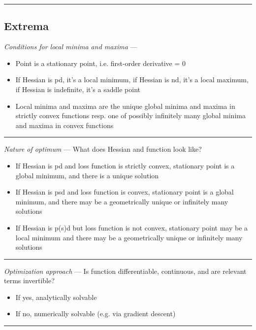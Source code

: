 {\color{black}\hrule height 0.001mm}

\subsection*{Extrema}
\emph{Conditions for local minima and maxima} --- 
\begin{itemize}
    \item Point is a stationary point, i.e. first-order derivative = 0
    \item If Hessian is pd, it's a local minimum, if Hessian is nd, it's a local maximum, if Hessian is indefinite, it's a saddle point
    \item Local minima and maxima are the unique global minima and maxima in strictly convex functions resp. one of possibly infinitely many global minima and maxima in convex functions
\end{itemize}

{\color{lightgray}\hrule height 0.001mm}

\emph{Nature of optimum} --- 
What does Hessian and function look like?
\begin{itemize}
    \item If Hessian is pd and loss function is strictly convex, stationary point is a global minimum, and there is a unique solution
    \item If Hessian is psd and loss function is convex, stationary point is a global minimum, and there may be a geometrically unique or infinitely many solutions
    \item If Hessian is p(s)d but loss function is not convex, stationary point may be a local minimum and there may be a geometrically unique or infinitely many solutions
\end{itemize}

{\color{lightgray}\hrule height 0.001mm}

\emph{Optimization approach} --- 
Is function differentiable, continuous, and are relevant terms invertible?
\begin{itemize}
    \item If yes, analytically solvable
    \item If no, numerically solvable (e.g. via gradient descent)
\end{itemize}

{\color{lightgray}\hrule height 0.001mm}

